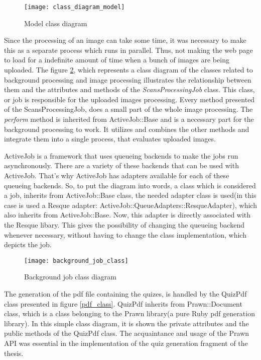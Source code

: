 \begin{figure}[!ht]
\centering
\texttt{[image: class\_diagram\_model]}
\caption{Model class diagram}\label{model_class}
\end{figure}

Since the processing of an image can take some time, it was necessary to make this as a separate process which runs in parallel. Thus, not making the web page to load for a indefinite amount of time when a bunch of images are being uploaded. The figure \ref{job_class}, which represents a class diagram of the classes related to background processing and image processing illustrates the relationship between them and the attributes and methods of the \textit{ScansProcessingJob} class. This class, or job is responsible for the uploaded images processing. Every method presented of the ScansProcessingJob, does a small part of the whole image processing. The \textit{perform} method is inherited from ActiveJob::Base and is a necessary part for the background processing to work. It utilizes and combines the other methods and integrate them into a single process, that evaluates uploaded images. 

ActiveJob is a framework that uses queueing backends to make the jobs run asynchronously. There are a variety of these backends that can be used with ActiveJob. That's why ActiveJob has adapters available for each of these queueing backends. So, to put the diagram into words, a class which is considered a job, inherits from ActiveJob::Base class, the needed adapter class is used(in this case is used a Resque adapter: ActiveJob::QueueAdapters::ResqueAdapter), which also inherits from ActiveJob::Base. Now, this adapter is directly associated with the Resque libary. This gives the possibility of changing the queueing backend whenever necessary, without having to change the class implementation, which depicts the job. 

\begin{figure}[!ht]
\centering
\texttt{[image: background\_job\_class]}
\caption{Background job class diagram}\label{job_class}
\end{figure}

The generation of the pdf file containing the quizes, is handled by the QuizPdf class presented in figure \ref{pdf_class}. QuizPdf inherits from Prawn::Document class, which is a class belonging to the Prawn library(a pure Ruby pdf generation library). In this simple class diagram, it is shown the private attributes and the public methods of the QuizPdf class. The acquaintance and usage of the Prawn API was essential in the implementation of the quiz generation fragment of the thesis.


